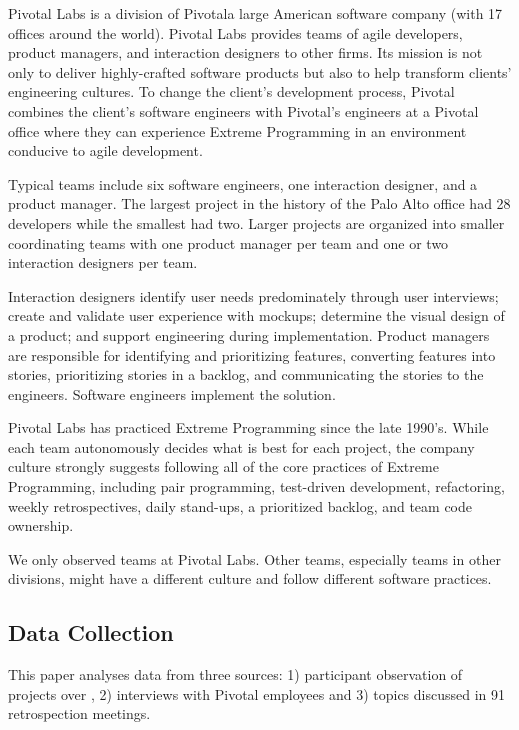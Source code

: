 Pivotal Labs is a division of Pivotal\textemdash a large American software company (with 17 offices around the world). Pivotal Labs provides teams of agile developers, product managers, and interaction designers to other firms. Its mission is not only to deliver highly-crafted software products but also to help transform clients' engineering cultures. To change the client's development process, Pivotal combines the client's software engineers with Pivotal's engineers at a Pivotal office where they can experience Extreme Programming \cite{BeckExtremeProgramming2004} in an environment conducive to agile development. 

Typical teams include six software engineers, one interaction designer, and a product manager. The largest project in the history of the Palo Alto office had 28 developers while the smallest had two. Larger projects are organized into smaller coordinating teams with one product manager per team and one or two interaction designers per team.

Interaction designers identify user needs predominately through user interviews; create and validate user experience with mockups; determine the visual design of a product; and support engineering during implementation. Product managers are responsible for identifying and prioritizing features, converting features into stories, prioritizing stories in a backlog, and communicating the stories to the engineers. Software engineers implement the solution. 

Pivotal Labs has practiced Extreme Programming \cite{BeckExtremeProgramming2004} since the late 1990's. While each team autonomously decides what is best for each project, the company culture strongly suggests following all of the core practices of Extreme Programming, including pair programming, test-driven development, refactoring, weekly retrospectives, daily stand-ups, a prioritized backlog, and team code ownership. 

We only observed teams at Pivotal Labs. Other teams, especially teams in other divisions, might have a different culture and follow different software practices.

\subsection{Data Collection}
This paper analyses data from three sources: 1) participant observation of \numberOfObservedProjects{} projects over \durationOfResearchStudyPlural{}, 2) interviews with Pivotal employees and 3) topics discussed in 91 retrospection meetings. 
